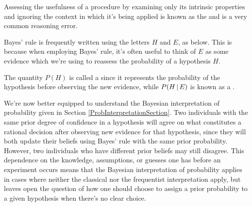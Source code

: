\par
Assessing the usefulness of a procedure by examining only its intrinsic properties and ignoring the context in which it's being applied is known as the  and is a very common reasoning error.
\par
Bayes' rule is frequently written using the letters $H$ and $E$, as below. This is because when employing Bayes' rule, it's often useful to think of $E$ as some evidence which we're using to reassess the probability of a hypothesis $H$. 
\par
The quantity $P(H)$ is called a  since it represents the probability of the hypothesis before observing the new evidence, while $P(H \,|\, E)$ is known as a .
\par
We're now better equipped to understand the Bayesian interpretation of probability given in Section \ref{ProbInterpretationSection}. Two individuals with the same prior degree of confidence in a hypothesis will agree on what constitutes a rational decision after observing new evidence for that hypothesis, since they will both update their beliefs using Bayes' rule with the same prior probability. However, two individuals who have different prior beliefs may still disagree. This dependence on the knowledge, assumptions, or guesses one has before an experiment occurs means that the Bayesian interpretation of probability applies in cases where neither the classical nor the frequentist interpretation apply, but leaves open the question of how one should choose to assign a prior probability to a given hypothesis when there's no clear choice.
